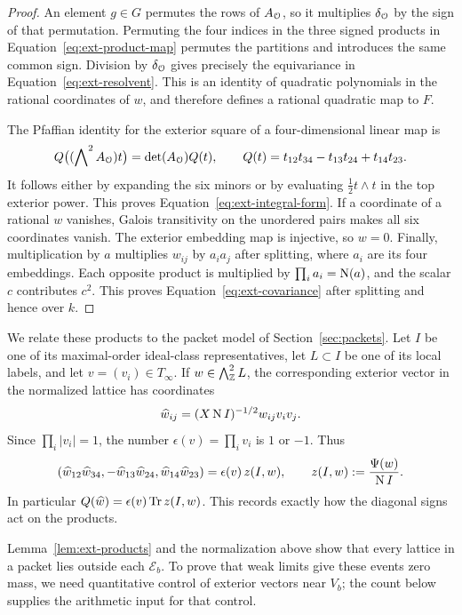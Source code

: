 \begin{proof}
An element \(g\in G\) permutes the rows of \(A_{\mathcal O}\), so it multiplies
\(\delta_{\mathcal O}\) by the sign of that permutation.  Permuting the four
indices in the three signed products in
Equation~\eqref{eq:ext-product-map} permutes the partitions and introduces
the same common sign.  Division by \(\delta_{\mathcal O}\) gives precisely the
equivariance in Equation~\eqref{eq:ext-resolvent}.  This is an identity of
quadratic polynomials in the rational coordinates of \(w\), and therefore
defines a rational quadratic map to \(F\).

The Pfaffian identity for the exterior square of a four-dimensional
linear map is
\[
 Q\bigl((\bigwedge\nolimits^2 A_{\mathcal O})t\bigr)
       =\det(A_{\mathcal O})Q(t),
 \qquad
 Q(t)=t_{12}t_{34}-t_{13}t_{24}+t_{14}t_{23}.
\]
It follows either by expanding the six minors or by evaluating
\(\frac12 t\wedge t\) in the top exterior power.  This proves
Equation~\eqref{eq:ext-integral-form}.  If a coordinate of a rational
\(w\) vanishes, Galois transitivity on the unordered pairs makes all six
coordinates vanish.  The exterior embedding map is injective, so \(w=0\).
Finally, multiplication by \(a\) multiplies \(w_{ij}\) by \(a_i a_j\)
after splitting, where \(a_i\) are its four embeddings.  Each opposite
product is multiplied by \(\prod_i a_i=\operatorname{N}(a)\), and the scalar \(c\)
contributes \(c^2\).  This proves Equation~\eqref{eq:ext-covariance}
after splitting and hence over \(k\).
\end{proof}

We relate these products to the packet model of Section~\ref{sec:packets}.
Let \(I\) be one of its maximal-order ideal-class representatives, let
\(L\subset I\) be one of its local labels, and let
\(v=(v_i)\in T_\infty\).  If \(w\in\bigwedge^2_{\mathbb Z}L\), the corresponding
exterior vector in the normalized lattice has coordinates
\[
 \widehat w_{ij}=(X\operatorname{N} I)^{-1/2}w_{ij}v_i v_j .
\]
Since \(\prod_i|v_i|=1\), the number
\(\epsilon(v)=\prod_i v_i\) is \(1\) or \(-1\).  Thus
\begin{equation}
 (\widehat w_{12}\widehat w_{34},
  -\widehat w_{13}\widehat w_{24},
  \widehat w_{14}\widehat w_{23})
   =\epsilon(v)\,z(I,w),\qquad
 z(I,w):=\frac{\Psi(w)}{\operatorname{N} I}.
 \label{eq:ext-signed-products}
\end{equation}
In particular \(Q(\widehat w)=\epsilon(v)\operatorname{Tr} z(I,w)\).  This records
exactly how the diagonal signs act on the products.

Lemma~\ref{lem:ext-products} and the normalization above show that every
lattice in a packet lies outside each \(\mathcal E_b\).  To prove that weak
limits give these events zero mass, we need quantitative control of exterior
vectors near \(V_b\); the count below supplies the arithmetic input for that
control.

